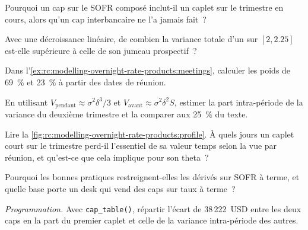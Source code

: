 \begin{exercise}[$\star$]\label{exo:rc:modelling-overnight-rate-products:1}
Pourquoi un cap sur le SOFR composé inclut-il un caplet sur le trimestre en cours, alors
qu'un cap interbancaire ne l'a jamais fait~?
\end{exercise}

\begin{exercise}[$\star$]\label{exo:rc:modelling-overnight-rate-products:2}
Avec une décroissance linéaire, de combien la variance totale d'un 
sur $[2,2.25]$ est-elle supérieure à celle de son jumeau prospectif~?
\end{exercise}

\begin{exercise}[$\star$]\label{exo:rc:modelling-overnight-rate-products:3}
Dans l'\cref{ex:rc:modelling-overnight-rate-products:meetings}, calculer les poids
de 69~\% et 23~\% à partir des dates de réunion.
\end{exercise}

\begin{exercise}[$\star\star$]\label{exo:rc:modelling-overnight-rate-products:4}
En utilisant $V_{\text{pendant}}\approx\sigma^2\delta^3/3$ et $V_{\text{avant}}\approx\sigma^2\delta^2S$,
estimer la part intra-période de la variance du deuxième trimestre et la comparer aux
25~\% du texte.
\end{exercise}

\begin{exercise}[$\star\star$]\label{exo:rc:modelling-overnight-rate-products:5}
Lire la \cref{fig:rc:modelling-overnight-rate-products:profile}. À quels jours un caplet court sur le trimestre
perd-il l'essentiel de sa valeur temps selon la vue par réunion, et
qu'est-ce que cela implique pour son theta~?
\end{exercise}

\begin{exercise}[$\star\star$]\label{exo:rc:modelling-overnight-rate-products:6}
Pourquoi les bonnes pratiques restreignent-elles les dérivés sur SOFR à terme, et quelle base
porte un desk qui vend des caps sur taux à terme~?
\end{exercise}

\begin{exercise}[$\star\star\star$]\label{exo:rc:modelling-overnight-rate-products:7}
\emph{Programmation.} Avec \texttt{cap\_table()}, répartir l'écart de 38\,222~USD entre
les deux caps en la part du premier caplet et celle de la variance intra-période des autres.
\end{exercise}

